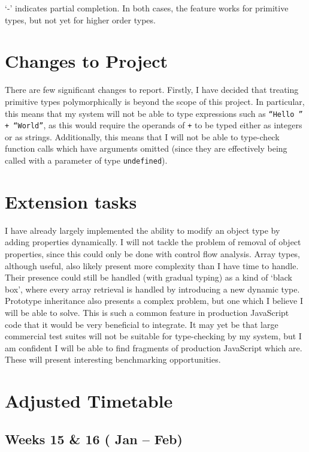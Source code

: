 \documentclass{article}
\begin{document}
	`-' indicates partial completion. In both cases, the feature works for
	primitive types, but not yet for higher order types.

	\section{Changes to Project}

		There are few significant changes to report. Firstly, I have decided that
		treating primitive types polymorphically is beyond the scope of this
		project. In particular, this means that my system will not be able to
		type expressions such as \texttt{``Hello '' + ``World''}, as this
		would require the operands of \texttt{+} to be typed either as
		integers or as strings. Additionally, this means that I will not be
		able to type-check function calls which have arguments omitted (since
		they are effectively being called with a parameter of type
		\texttt{undefined}).

	\section{Extension tasks}

		I have already largely implemented the ability to modify an object
		type by adding properties dynamically. I will not tackle the problem
		of removal of object properties, since this could only be done with
		control flow analysis. Array types, although useful, also likely
		present more complexity than I have time to handle. Their presence
		could still be handled (with gradual typing) as a kind of `black box',
		where every array retrieval is handled by introducing a new dynamic
		type. Prototype inheritance also presents a complex problem, but one
		which I believe I will be able to solve. This is such a common feature
		in production JavaScript code that it would be very beneficial to
		integrate. It may yet be that large commercial test suites will not be
		suitable for type-checking by my system, but I am confident I will be
		able to find fragments of production JavaScript which are. These will
		present interesting benchmarking opportunities.

	\section{Adjusted Timetable}

		\subsection*{Weeks 15 \& 16 ( Jan --  Feb)}
\end{document}
